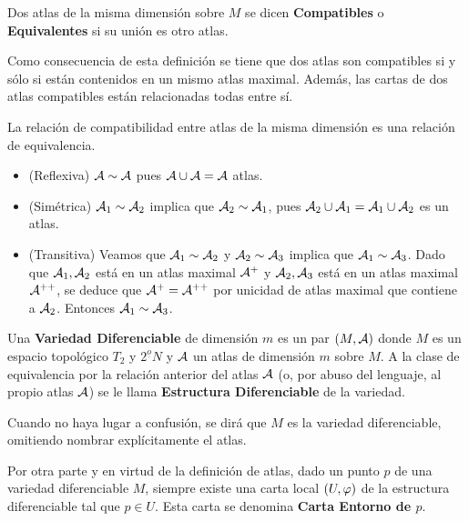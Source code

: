 \documentclass[cursovd_portada.tex]{subfiles}
\begin{document}
\begin{defi}
Dos atlas de la misma dimensión sobre $M$ se dicen {\bf Compatibles} o {\bf Equivalentes} si su unión es otro
atlas.
\end{defi}
Como consecuencia de esta definición se tiene que dos atlas
son compatibles si y sólo si están contenidos en un mismo
atlas maximal. Además, las cartas de dos atlas compatibles
están relacionadas todas entre sí.
\begin{prop}
La relación de compatibilidad entre atlas de la misma dimensión es una relación de equivalencia.
\end{prop}

\begin{dem}\mbox{}
\begin{itemize}
	\item (Reflexiva) ${\mathcal{A}} \sim {\mathcal{A}}$ pues ${\mathcal{A}} \cup {\mathcal{A}} = {\mathcal{A}}$ atlas.
	\item (Simétrica) ${\mathcal{A}}_1 \sim {\mathcal{A}}_2$ implica que ${\mathcal{A}}_2 \sim {\mathcal{A}}_1$, pues ${\mathcal{A}}_2 \cup {\mathcal{A}}_1 = {\mathcal{A}}_1 \cup {\mathcal{A}}_2$ es un atlas.
	\item (Transitiva) Veamos que ${\mathcal{A}}_1 \sim {\mathcal{A}}_2$ y ${\mathcal{A}}_2 \sim {\mathcal{A}}_3$ implica que ${\mathcal{A}}_1 \sim {\mathcal{A}}_3$. Dado que ${\mathcal{A}}_1,{\mathcal{A}}_2$ está en un atlas maximal ${\mathcal{A}}^+$ y ${\mathcal{A}}_2,{\mathcal{A}}_3$ está en un atlas maximal ${\mathcal{A}}^{++}$, se deduce que ${\mathcal{A}}^+={\mathcal{A}}^{++}$ por unicidad de atlas maximal que contiene a ${\mathcal{A}}_2$. Entonces ${\mathcal{A}}_1 \sim {\mathcal{A}}_3$.
\end{itemize}
\end{dem}

\begin{defi} Una {\bf Variedad Diferenciable} de dimensión $m$ es un par $(M,{\cal A})$ donde $M$ es un espacio
topológico $T_2$ y $2^{\underline{o}}N$ y ${\cal A}$ un atlas de dimensión $m$ sobre $M$. A la clase de
equivalencia por la relación anterior del atlas ${\cal A}$ (o, por abuso del lenguaje, al propio atlas ${\cal A}$)
se le llama {\bf Estructura Diferenciable} de la variedad.
\end{defi}
Cuando no haya lugar a confusión, se dirá que $M$ es la variedad diferenciable, omitiendo nombrar explícitamente
el atlas.
\par
Por otra parte y en virtud de la definición de atlas, dado un punto $p$ de una variedad diferenciable $M$, siempre
existe una carta local $(U,\varphi)$ de la estructura diferenciable tal que $p\in U$. Esta carta se denomina {\bf
Carta Entorno de $p$}.

\newpage
\end{document}
